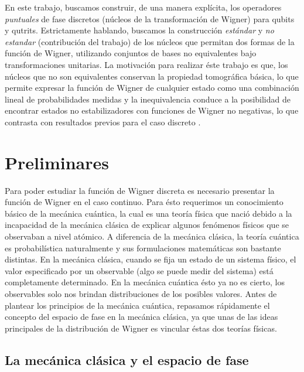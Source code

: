 \documentclass[a4paper]{report}
\begin{document}
  En este trabajo, buscamos construir, de una manera
  explícita, los operadores \textit{puntuales} de fase
  discretos (núcleos de la transformación de Wigner) para
  qubits y qutrits. Estrictamente hablando, buscamos la
  construcción \textit{estándar}
  \cite{woottersWignerFunctionFormulationFiniteState1987} y
  \textit{no estandar} (contribución del trabajo) de los
  núcleos que permitan dos formas de la función de Wigner,
  utilizando conjuntos de bases no equivalentes bajo
  transformaciones unitarias. La motivación para realizar
  éste trabajo es que, los núcleos que no son equivalentes
  conservan la propiedad tomográfica básica, lo que permite
  expresar la función de Wigner de cualquier estado como una
  combinación lineal de probabilidades medidas y la
  inequivalencia conduce a la posibilidad de encontrar
  estados no estabilizadores con funciones de Wigner no
  negativas, lo que contrasta con resultados previos para el
  caso discreto
  \cite{grossHudsonTheoremFinitedimensional2006,
  galvaoDiscreteWignerFunctions2005,
  cormickInterferenceDiscreteWigner2006}.

  \chapter{Preliminares}

  Para poder estudiar la función de Wigner discreta es
  necesario presentar la función de Wigner en el caso
  continuo. Para ésto requerimos un conocimiento básico de
  la mecánica cuántica, la cual es una teoría física que
  nació debido a la incapacidad de la mecánica clásica de
  explicar algunos fenómenos físicos que se observaban a
  nivel atómico. A diferencia de la mecánica clásica, la
  teoría cuántica es probabilística naturalmente y sus
  formulaciones matemáticas son bastante distintas. En la
  mecánica clásica, cuando se fija un estado de un sistema
  físico, el valor especificado por un observable (algo se
  puede medir del sistema) está completamente determinado.
  En la mecánica cuántica ésto ya no es cierto, los
  observables solo nos brindan distribuciones de los
  posibles valores. Antes de plantear los principios de la
  mecánica cuántica, repasamos rápidamente el concepto del
  espacio de fase en la mecánica clásica, ya que unas de las
  ideas principales de la distribución de Wigner es vincular
  éstas dos teorías físicas.

  \section{La mecánica clásica y el espacio de fase}
\end{document}
